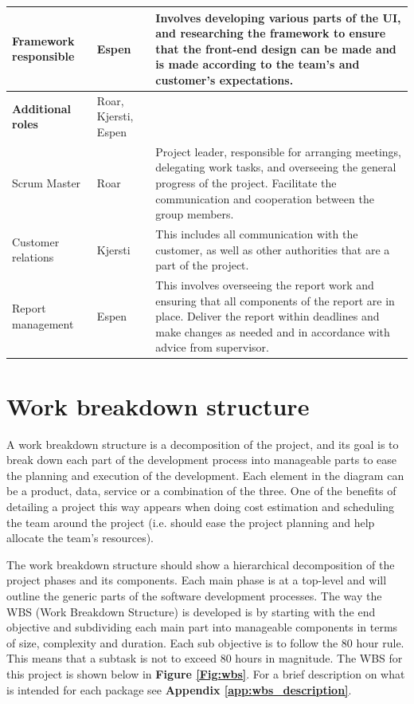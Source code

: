 \begin{table}[!h]
\begin{tabular}{ | p{3.7cm} | p{2.8cm} | p{10.5cm} |}
			Framework responsible & Espen & Involves developing various parts of the UI, and researching the framework to ensure that the front-end design can be made and is made according to the team's and customer's expectations. \\ \hline
			
			\textbf{Additional roles} & Roar, Kjersti, Espen & \\ \hline
			
			Scrum Master & Roar & Project leader, responsible for arranging meetings, delegating work tasks, and overseeing the general progress of the project. Facilitate the communication and cooperation between the group members. \\ \hline
			
			Customer relations & Kjersti & This includes all communication with the customer, as well as other authorities that are a part of the project. \\ \hline
			
			Report management & Espen & This involves overseeing the report work and ensuring that all components of the report are in place. Deliver the report within deadlines and make changes as needed and in accordance with advice from supervisor. \\ \hline
		\end{tabular}
	\label{Tab:roles}
\end{table}

\section{Work breakdown structure}

A work breakdown structure is a decomposition of the project, and its goal is to break down each part of the development process into manageable parts to ease the planning and execution of the development. Each element in the diagram can be a product, data, service or a combination of the three. One of the benefits of detailing a project this way appears when doing cost estimation and scheduling the team around the project (i.e. should ease the project planning and help allocate the team's resources).\newline

The work breakdown structure should show a hierarchical decomposition of the project phases and its components. Each main phase is at a top-level and will outline the generic parts of the software development processes. The way the WBS (Work Breakdown Structure) is developed is by starting with the end objective and subdividing each main part into manageable components in terms of size, complexity and duration. Each sub objective is to follow the 80 hour rule. This means that a subtask is not to exceed 80 hours in magnitude. The WBS for this project is shown below in \textbf{Figure \ref{Fig:wbs}}. For a brief description on what is intended for each package see \textbf{Appendix \ref{app:wbs_description}}.

